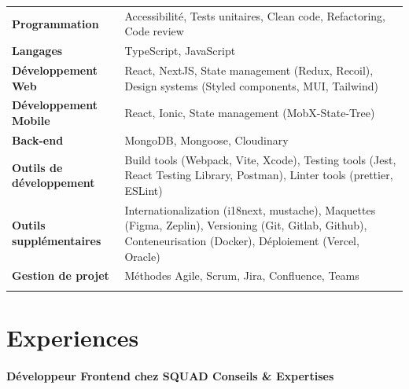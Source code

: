 \documentclass{article}
\begin{document}
\begin{tabularx}{\textwidth}{@{}lX@{}}

\textbf{Programmation} & Accessibilité, Tests unitaires, Clean code, Refactoring, Code review \\
\addlinespace[5pt]

\textbf{Langages} & TypeScript, JavaScript \\
\addlinespace[5pt]

\textbf{Développement Web} & React, NextJS, State management (Redux, Recoil), Design systems (Styled components, MUI, Tailwind) \\
\addlinespace[5pt]

\textbf{Développement Mobile} & React, Ionic, State management (MobX-State-Tree) \\
\addlinespace[5pt]

\textbf{Back-end} & MongoDB, Mongoose, Cloudinary \\
\addlinespace[5pt]

\textbf{Outils de développement} & Build tools (Webpack, Vite, Xcode), Testing tools (Jest, React Testing Library, Postman), Linter tools (prettier, ESLint) \\
\addlinespace[5pt]

\textbf{Outils supplémentaires} & Internationalization (i18next, mustache), Maquettes (Figma, Zeplin), Versioning (Git, Gitlab, Github), Conteneurisation (Docker), Déploiement (Vercel, Oracle) \\
\addlinespace[5pt]

\textbf{Gestion de projet} & Méthodes Agile, Scrum, Jira, Confluence, Teams \\
\addlinespace[5pt]

  
\end{tabularx}

\vspace{4ex}
\hrulefill
\section*{Experiences}

\paragraph{Développeur Frontend chez SQUAD Conseils \& Expertises}\
\end{document}
